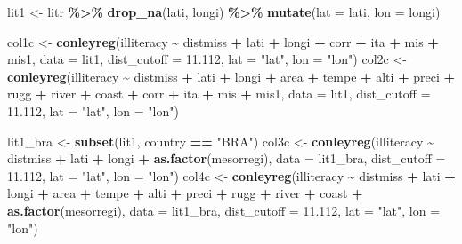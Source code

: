 \documentclass[
  a4paper,
]{article}
\newenvironment{Shaded}{\begin{snugshade}}{\end{snugshade}}
\newcommand{\AttributeTok}[1]{\textcolor[rgb]{0.13,0.29,0.53}{#1}}
\newcommand{\FloatTok}[1]{\textcolor[rgb]{0.00,0.00,0.81}{#1}}
\newcommand{\FunctionTok}[1]{\textcolor[rgb]{0.13,0.29,0.53}{\textbf{#1}}}
\newcommand{\NormalTok}[1]{#1}
\newcommand{\OtherTok}[1]{\textcolor[rgb]{0.56,0.35,0.01}{#1}}
\newcommand{\SpecialCharTok}[1]{\textcolor[rgb]{0.81,0.36,0.00}{\textbf{#1}}}
\newcommand{\StringTok}[1]{\textcolor[rgb]{0.31,0.60,0.02}{#1}}
\begin{document}
\begin{Shaded}
\begin{Highlighting}[]
\NormalTok{lit1 }\OtherTok{\textless{}{-}}\NormalTok{ litr }\SpecialCharTok{\%\textgreater{}\%}
    \FunctionTok{drop\_na}\NormalTok{(lati, longi) }\SpecialCharTok{\%\textgreater{}\%}
    \FunctionTok{mutate}\NormalTok{(}\AttributeTok{lat =}\NormalTok{ lati, }\AttributeTok{lon =}\NormalTok{ longi)}

\NormalTok{col1c }\OtherTok{\textless{}{-}} \FunctionTok{conleyreg}\NormalTok{(illiteracy }\SpecialCharTok{\textasciitilde{}}\NormalTok{ distmiss }\SpecialCharTok{+}\NormalTok{ lati }\SpecialCharTok{+}\NormalTok{ longi }\SpecialCharTok{+}\NormalTok{ corr }\SpecialCharTok{+}\NormalTok{ ita }\SpecialCharTok{+}\NormalTok{ mis }\SpecialCharTok{+}\NormalTok{ mis1,}
    \AttributeTok{data =}\NormalTok{ lit1, }\AttributeTok{dist\_cutoff =} \FloatTok{11.112}\NormalTok{, }\AttributeTok{lat =} \StringTok{"lat"}\NormalTok{, }\AttributeTok{lon =} \StringTok{"lon"}\NormalTok{)}
\NormalTok{col2c }\OtherTok{\textless{}{-}} \FunctionTok{conleyreg}\NormalTok{(illiteracy }\SpecialCharTok{\textasciitilde{}}\NormalTok{ distmiss }\SpecialCharTok{+}\NormalTok{ lati }\SpecialCharTok{+}\NormalTok{ longi }\SpecialCharTok{+}\NormalTok{ area }\SpecialCharTok{+}\NormalTok{ tempe }\SpecialCharTok{+}\NormalTok{ alti }\SpecialCharTok{+}\NormalTok{ preci }\SpecialCharTok{+}
\NormalTok{    rugg }\SpecialCharTok{+}\NormalTok{ river }\SpecialCharTok{+}\NormalTok{ coast }\SpecialCharTok{+}\NormalTok{ corr }\SpecialCharTok{+}\NormalTok{ ita }\SpecialCharTok{+}\NormalTok{ mis }\SpecialCharTok{+}\NormalTok{ mis1, }\AttributeTok{data =}\NormalTok{ lit1, }\AttributeTok{dist\_cutoff =} \FloatTok{11.112}\NormalTok{,}
    \AttributeTok{lat =} \StringTok{"lat"}\NormalTok{, }\AttributeTok{lon =} \StringTok{"lon"}\NormalTok{)}

\NormalTok{lit1\_bra }\OtherTok{\textless{}{-}} \FunctionTok{subset}\NormalTok{(lit1, country }\SpecialCharTok{==} \StringTok{"BRA"}\NormalTok{)}
\NormalTok{col3c }\OtherTok{\textless{}{-}} \FunctionTok{conleyreg}\NormalTok{(illiteracy }\SpecialCharTok{\textasciitilde{}}\NormalTok{ distmiss }\SpecialCharTok{+}\NormalTok{ lati }\SpecialCharTok{+}\NormalTok{ longi }\SpecialCharTok{+} \FunctionTok{as.factor}\NormalTok{(mesorregi), }\AttributeTok{data =}\NormalTok{ lit1\_bra,}
    \AttributeTok{dist\_cutoff =} \FloatTok{11.112}\NormalTok{, }\AttributeTok{lat =} \StringTok{"lat"}\NormalTok{, }\AttributeTok{lon =} \StringTok{"lon"}\NormalTok{)}
\NormalTok{col4c }\OtherTok{\textless{}{-}} \FunctionTok{conleyreg}\NormalTok{(illiteracy }\SpecialCharTok{\textasciitilde{}}\NormalTok{ distmiss }\SpecialCharTok{+}\NormalTok{ lati }\SpecialCharTok{+}\NormalTok{ longi }\SpecialCharTok{+}\NormalTok{ area }\SpecialCharTok{+}\NormalTok{ tempe }\SpecialCharTok{+}\NormalTok{ alti }\SpecialCharTok{+}\NormalTok{ preci }\SpecialCharTok{+}
\NormalTok{    rugg }\SpecialCharTok{+}\NormalTok{ river }\SpecialCharTok{+}\NormalTok{ coast }\SpecialCharTok{+} \FunctionTok{as.factor}\NormalTok{(mesorregi), }\AttributeTok{data =}\NormalTok{ lit1\_bra, }\AttributeTok{dist\_cutoff =} \FloatTok{11.112}\NormalTok{,}
    \AttributeTok{lat =} \StringTok{"lat"}\NormalTok{, }\AttributeTok{lon =} \StringTok{"lon"}\NormalTok{)}


\end{Highlighting}
\end{Shaded}
\end{document}
